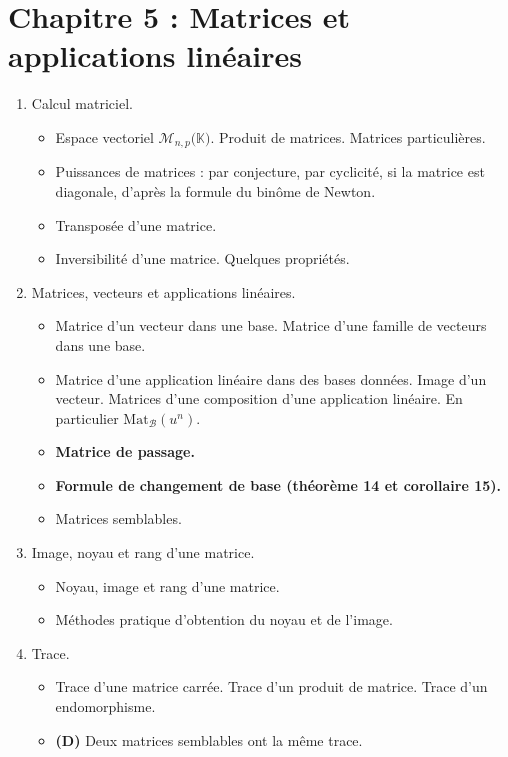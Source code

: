 \documentclass[twoside,a4paper,french,10pt]{VcCours}
\begin{document}
\newpage
\section*{Chapitre 5 : Matrices et applications linéaires}

\begin{enumerate}
\item Calcul matriciel.
\begin{itemize}
\item Espace vectoriel $\mathcal{M}_{n,p}(\mathbb{K)}$. Produit de matrices. Matrices particulières. 
\item Puissances de matrices : par conjecture, par cyclicité, si la matrice est diagonale, d'après la formule du binôme de Newton.
\item Transposée d'une matrice.
\item Inversibilité d'une matrice. Quelques propriétés. 
\end{itemize}
\item Matrices, vecteurs et applications linéaires.
\begin{itemize}
\item Matrice d'un vecteur dans une base. Matrice d'une famille de vecteurs dans une base.
\item Matrice d'une application linéaire dans des bases données. Image d'un vecteur. Matrices d'une composition d'une application linéaire. En particulier $\textrm{Mat}_{\mathcal{B}}(u^n)$. 
\item \textbf{Matrice de passage.}
\item \textbf{Formule de changement de base (théorème 14 et corollaire 15).}
\item Matrices semblables.
\end{itemize}
\item Image, noyau et rang d'une matrice.
\begin{itemize}
\item Noyau, image et rang d'une matrice.
\item Méthodes pratique d'obtention du noyau et de l'image. 
\end{itemize}
\item Trace.
\begin{itemize}
\item Trace d'une matrice carrée. Trace d'un produit de matrice. Trace d'un endomorphisme. 
\item \textbf{(D)} Deux matrices semblables ont la même trace.
\end{itemize}
\end{enumerate}
\end{document}
